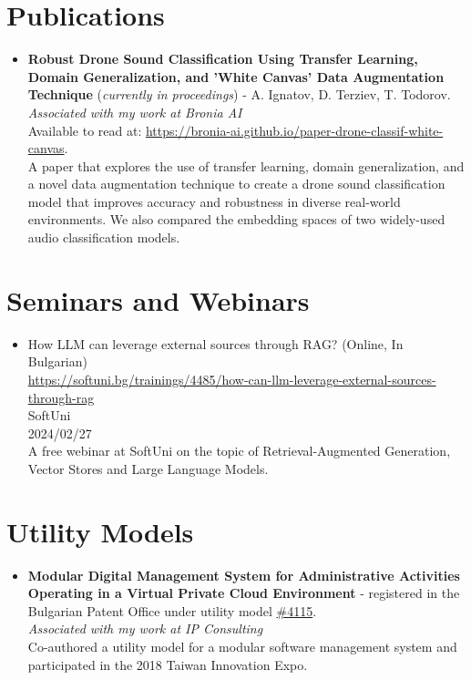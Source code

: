 \documentclass[11pt,a4paper]{article}
\begin{document}
\section{Publications}
\begin{itemize}[leftmargin=*]
    \item \textbf{Robust Drone Sound Classification Using Transfer
    Learning, Domain Generalization, and 'White
    Canvas' Data Augmentation Technique} (\textit{currently in proceedings}) - A. Ignatov, D. Terziev, T. Todorov. \\
    \textit{Associated with my work at Bronia AI} \\
    Available to read at: \href{https://bronia-ai.github.io/paper-drone-classif-white-canvas/}{https://bronia-ai.github.io/paper-drone-classif-white-canvas}. \\
    A paper that explores the use of transfer learning, domain generalization, and a novel data augmentation technique
    to create a drone sound classification model that improves accuracy and robustness in diverse real-world environments.
    We also compared the embedding spaces of two widely-used audio classification models.
\end{itemize}

\section{Seminars and Webinars}
\begin{itemize}
    \item How LLM can leverage external sources through RAG? (Online, In Bulgarian) \\
    \href{https://softuni.bg/trainings/4485/how-can-llm-leverage-external-sources-through-rag}{https://softuni.bg/trainings/4485/how-can-llm-leverage-external-sources-through-rag} \\
    SoftUni \\
    2024/02/27 \\
    A free webinar at SoftUni on the topic of Retrieval-Augmented Generation, Vector Stores and Large Language Models.

\end{itemize}

\section{Utility Models}
\begin{itemize}[leftmargin=*]
    \item \textbf{Modular Digital Management System for Administrative Activities Operating in a Virtual Private Cloud Environment} - registered in the Bulgarian Patent Office under utility model \href{https://portal.bpo.bg/rd?key=2018004115U}{\#4115}. \\
    \textit{Associated with my work at IP Consulting} \\
    Co-authored a utility model for a modular software management system and participated in the 2018 Taiwan Innovation Expo.
\end{itemize}
\end{document}
